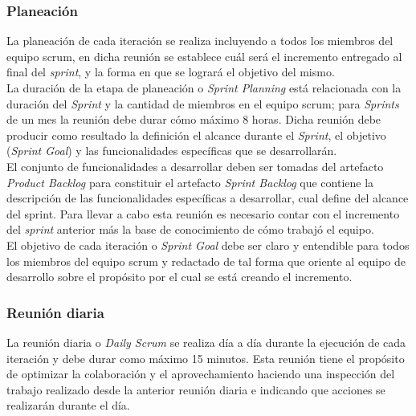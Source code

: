 \subsubsection{Planeación}

 La planeación de cada iteración se realiza incluyendo a todos los miembros del equipo scrum,
 en dicha reunión se establece cuál será el incremento entregado al final del {\it sprint}, y la
 forma en que se logrará el objetivo del mismo.\\

 \noindent La duración de la etapa de planeación o {\it Sprint Planning} está relacionada con la
 duración del {\it Sprint} y la cantidad de miembros en el equipo scrum; para {\it Sprints} de
 un mes la reunión debe durar cómo máximo 8 horas. Dicha reunión debe producir como resultado
 la definición el alcance durante el {\it Sprint}, el objetivo ({\it Sprint Goal}) y las
 funcionalidades específicas que se desarrollarán.\\

 \noindent El conjunto de funcionalidades a desarrollar deben ser tomadas del artefacto {\it Product
 Backlog} para constituir el artefacto {\it Sprint Backlog} que contiene la descripción de las
 funcionalidades específicas a desarrollar, cual define del alcance del sprint. Para llevar a cabo
 esta reunión es necesario contar con el incremento del {\it sprint} anterior más la base
 de conocimiento de cómo trabajó el equipo.\\



 \noindent El objetivo de cada iteración o {\it Sprint Goal} debe ser claro y entendible para todos
 los miembros del equipo scrum y redactado de tal forma que oriente al equipo de desarrollo sobre
 el propósito por el cual se está creando el incremento.

\subsubsection{Reunión diaria}

 La reunión diaria o {\it Daily Scrum} se realiza día a día durante la ejecución de cada iteración
 y debe durar como máximo 15 minutos. Esta reunión tiene el propósito de optimizar la colaboración
 y el aprovechamiento haciendo una inspección del trabajo realizado desde la anterior reunión diaria
 e indicando que acciones se realizarán durante el día.\\

